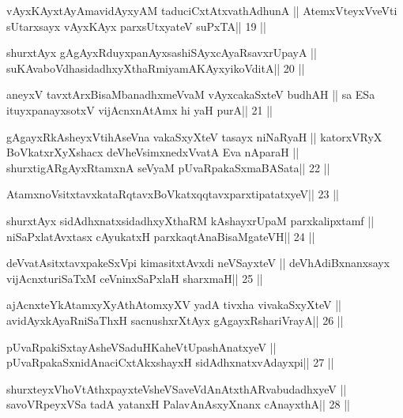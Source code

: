 \begin{shl}
vAyxKAyxtAyAmavidAyxyAM taduciCxtAtxvathAdhunA ||
AtemxVteyxVveVti sUtarxsayx vAyxKAyx parxsUtxyateV suPxTA\hfill || 19 ||
\end{shl}

\begin{shl}
shurxtAyx gAgAyxRduyxpanAyxsashiSAyxcAyaRsavxrUpayA ||
suKAvaboVdhasidadhxyXthaRmiyamAKAyxyikoVditA\hfill || 20 ||
\end{shl}

\begin{shl}
aneyxV tavxtArxBisaMbanadhxmeVvaM vAyxcakaSxteV budhAH ||
sa ESa ituyxpanayxsotxV vijAcnxnAtAmx hi yaH purA\hfill || 21 ||
\end{shl}

\begin{shl}
gAgayxRkAsheyxVtihAseVna vakaSxyXteV tasayx niNaRyaH ||
katorxVRyX BoVkatxrXyXshacx deVheV\s simxnedxVvatA Eva nAparaH ||
shurxtigARgAyxRtamxnA seVyaM pUvaRpakaSxmaBASata\hfill || 22 ||
\end{shl}

\begin{shl}
AtamxnoV\s sitxtavxkataRqtavxBoVkatxqqtavxparxtipatatxyeV\hfill || 23 ||
\end{shl}

\begin{shl}
shurxtAyx sidAdhxnatxsidadhxyXthaRM kAshayxrUpaM parxkalipxtamf ||
niSaPxlatAvxtasx cAyukatxH parxkaqtAnaBisaMgateVH\hfill || 24 ||
\end{shl}

\begin{shl}
deVvatAsitxtavxpakeSxV\s pi kimasitxtAvxdi neVSayxteV ||
deVhAdiBxnanxsayx vijAcnxturiSaTxM ceVninxSaPxlaH sharxmaH\hfill || 25 ||
\end{shl}

\begin{shl}
ajAcnxteYkAtamxyXyAthAtomxyXV yadA tivxha vivakaSxyXteV ||
avidAyxkAyaRniSaThxH sacnushxrXtAyx gAgayxRshariVrayA\hfill || 26 ||
\end{shl}

\begin{shl}
pUvaRpakiSxtayA\s sheVSaduHKaheVtUpashAnatxyeV ||
pUvaRpakaSxnidAnaciCxtAkxshayxH sidAdhxnatxvAdayxpi\hfill || 27 ||
\end{shl}

\begin{shl}
shurxteyxVhoVtAthxpayxteV\s sheVSaveVdAnAtxthARvabudadhxyeV ||
savoVR\s peyxVSa tadA yatanxH PalavAnAsxyXnanx cAnayxthA\hfill || 28 ||
\end{shl}

